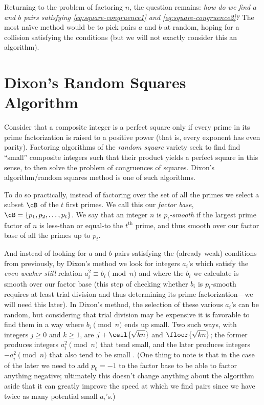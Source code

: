 \documentclass{report}
\begin{document}
Returning to the problem of factoring $n$, the question remains:
\emph{how do we find $a$ and $b$ pairs satisfying \cref{eq:square-congruence1} and
\cref{eq:square-congruence2}?}
The most naïve method would be to pick pairs $a$ and $b$ at random, hoping for a collision
satisfying the conditions (but we will not exactly consider this an algorithm).

\section{Dixon's Random Squares Algorithm}

Consider that a composite integer is a perfect square only if every prime in its prime factorization
is raised to a positive power (that is, every exponent has even parity). Factoring algorithms of the
\emph{random square} variety seek to find find ``small'' composite integers such that their product
yields a perfect square in this sense, to then solve the problem of congruences of squares.
Dixon's algorithm/random squares method is one of such algorithms.

To do so practically, instead of factoring over the set of all the primes we select a subset $\cB$
of the $t$ first primes. We call this our \emph{factor base}, $\cB = \{p_1,p_2,\ldots,p_t\}$.
We say that an integer $n$ is \emph{$p_t$-smooth} if the largest prime factor of $n$ is less-than or
equal-to the $t^\text{th}$ prime, and thus smooth over our factor base of all the primes up to $p_t$.

And instead of looking for $a$ and $b$ pairs satisfying the (already weak) conditions from previously,
by Dixon's method we look for integers $a_i$'s which satisfy the \emph{even weaker still} relation
$a_i^2\equiv b_i\pmod n$ and where the $b_i$ we calculate is smooth over our factor base
(this step of checking whether $b_i$ is $p_t$-smooth requires at least trial division and thus
determining its prime factorization---we will need this later).
In Dixon's method, the selection of these various $a_i$'s can be random, but considering that trial
division may be expensive it is favorable to find them in a way where $b_i\pmod n$ ends up small.
Two such ways, with integers $j\ge 0$ and $k\ge 1$, are $j+\ceil{\sqrt{kn}}$ and
$\floor{\sqrt{kn}}$; the former produces integers $a_i^2\pmod n$ that tend small, and
the later produces integers $-a_i^2\pmod n$ that also tend to be small \cite{handbook}.
(One thing to note is that in the case of the later we need to add $p_0=-1$ to the
factor base to be able to factor anything negative; ultimately this doesn't change
anything about the algorithm aside that it can greatly improve the speed at which we find pairs
since we have twice as many potential small $a_i$'s.)
\end{document}
